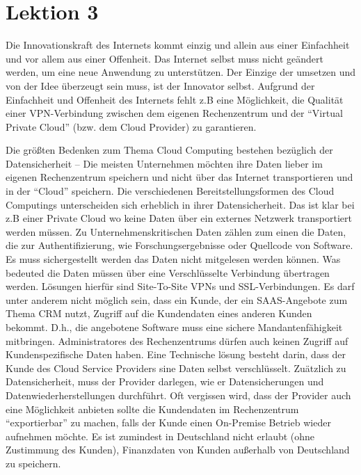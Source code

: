 \documentclass[a4paper,10pt]{article}
\begin{document}
\section{Lektion 3}
Die Innovationskraft des Internets kommt einzig und allein aus einer Einfachheit und vor allem aus einer Offenheit. Das Internet selbst muss nicht geändert werden, um eine neue Anwendung zu unterstützen. Der Einzige der umsetzen und von der Idee überzeugt sein muss, ist der Innovator selbst. Aufgrund der Einfachheit und Offenheit des Internets fehlt z.B eine Möglichkeit, die Qualität einer VPN-Verbindung zwischen dem eigenen Rechenzentrum und der ``Virtual Private Cloud'' (bzw. dem Cloud Provider) zu garantieren.
\vspace{3mm}

Die größten Bedenken zum Thema Cloud Computing bestehen bezüglich der Datensicherheit -- Die meisten Unternehmen möchten ihre Daten lieber im eigenen Rechenzentrum speichern und nicht über das Internet transportieren und in der ``Cloud'' speichern. Die verschiedenen Bereitstellungsformen des Cloud Computings unterscheiden sich erheblich in ihrer Datensicherheit. Das ist klar bei z.B einer Private Cloud wo keine Daten über ein externes Netzwerk transportiert werden müssen. Zu Unternehmenskritischen Daten zählen zum einen die Daten, die zur Authentifizierung, wie Forschungsergebnisse oder Quellcode von Software. Es muss sichergestellt werden das Daten nicht mitgelesen werden können. Was bedeuted die Daten müssen über eine Verschlüsselte Verbindung übertragen werden. Lösungen hierfür sind Site-To-Site VPNs und SSL-Verbindungen. Es darf unter anderem nicht möglich sein, dass ein Kunde, der ein SAAS-Angebote zum Thema CRM nutzt, Zugriff auf die Kundendaten eines anderen Kunden bekommt. D.h., die angebotene Software muss eine sichere Mandantenfähigkeit mitbringen. Administratores des Rechenzentrums dürfen auch keinen Zugriff auf Kundenspezifische Daten haben. Eine Technische lösung besteht darin, dass der Kunde des Cloud Service Providers sine Daten selbst verschlüsselt.
\vspace{3mm}
Zuätzlich zu Datensicherheit, muss der Provider darlegen, wie er Datensicherungen und Datenwiederherstellungen durchführt. Oft vergissen wird, dass der Provider auch eine Möglichkeit anbieten sollte die Kundendaten im Rechenzentrum ``exportierbar'' zu machen, falls der Kunde einen On-Premise Betrieb wieder aufnehmen möchte. Es ist zumindest in Deutschland nicht erlaubt (ohne Zustimmung des Kunden), Finanzdaten von Kunden außerhalb von Deutschland zu speichern.
\vspace{3mm}
\end{document}
